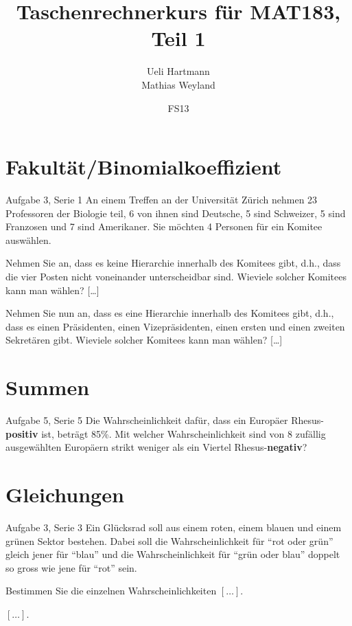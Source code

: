 \documentclass{beamer}
\title{Taschenrechnerkurs für MAT183, Teil 1}
\author{Ueli Hartmann\\Mathias Weyland}
\date{FS13}
\begin{document}
\frame{\maketitle}


\section{Fakultät/Binomialkoeffizient}

\begin{frame}{Aufgabe 3, Serie 1}
An einem Treffen an der Universität Zürich nehmen 23 Professoren der Biologie teil, 6 von
ihnen sind Deutsche, 5 sind Schweizer, 5 sind Franzosen und 7 sind Amerikaner.
Sie möchten 4 Personen für ein Komitee auswählen.

\begin{outline}
\item Nehmen Sie an, dass es keine Hierarchie innerhalb des Komitees gibt, d.h., dass die
vier Posten nicht voneinander unterscheidbar sind. Wieviele solcher Komitees kann
man wählen? [\ldots]\pause
\item Nehmen Sie nun an, dass es eine Hierarchie innerhalb des Komitees gibt, d.h., dass es
einen Präsidenten, einen Vizepräsidenten, einen ersten und einen zweiten
Sekretären gibt. Wieviele solcher Komitees kann man wählen? [\ldots]
\end{outline}
\end{frame}

\section{Summen}
\begin{frame}{Aufgabe 5, Serie 5}
Die Wahrscheinlichkeit dafür, dass ein Europäer Rhesus-\textbf{positiv} ist,
beträgt 85\%. Mit welcher Wahrscheinlichkeit sind von 8 zufällig
ausgewählten Europäern strikt weniger als ein Viertel
Rhesus-\textbf{negativ}?
\end{frame}

\section{Gleichungen}
\begin{frame}{Aufgabe 3, Serie 3}
Ein Glücksrad soll aus einem roten, einem blauen und einem grünen Sektor
bestehen. Dabei soll die Wahrscheinlichkeit für ``rot oder grün'' gleich jener
für ``blau'' und die Wahrscheinlichkeit für ``grün oder blau'' doppelt so gross
wie jene für ``rot'' sein.
\begin{outline}
\item Bestimmen Sie die einzelnen Wahrscheinlichkeiten $[\dots]$.
\item $[\dots]$.
\end{outline}
\end{frame}
\end{document}
